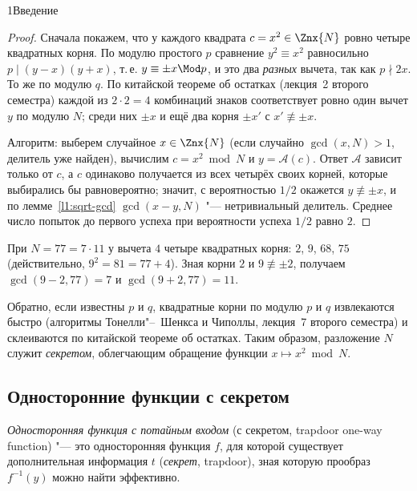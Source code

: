 \begin{lecture}{1}{Введение}
\begin{proof}
Сначала покажем, что у каждого квадрата $c = x^2 \in \Znx{N}$ ровно четыре квадратных корня.
По модулю простого $p$ сравнение $y^2 \equiv x^2$ равносильно $p \mid (y - x)(y + x)$, т.\,е.
$y \equiv \pm x \Mod p$, и это два \emph{разных} вычета, так как $p \nmid 2x$. То же по модулю
$q$. По китайской теореме об остатках (лекция~2 второго семестра) каждой из $2 \cdot 2 = 4$
комбинаций знаков соответствует ровно один вычет $y$ по модулю $N$; среди них $\pm x$ и ещё
два корня $\pm x'$ с $x' \not\equiv \pm x$.

Алгоритм: выберем случайное $x \in \Znx{N}$ (если случайно $\gcd(x, N) > 1$, делитель уже
найден), вычислим $c = x^2 \bmod N$ и $y = \mathcal A(c)$. Ответ $\mathcal A$ зависит только
от $c$, а $c$ одинаково получается из всех четырёх своих корней, которые выбирались бы
равновероятно; значит, с вероятностью $1/2$ окажется $y \not\equiv \pm x$, и по
лемме~\ref{l1:sqrt-gcd} $\gcd(x - y, N)$ "--- нетривиальный делитель. Среднее число попыток до
первого успеха при вероятности успеха $1/2$ равно $2$.
\end{proof}

\begin{example}
При $N = 77 = 7 \cdot 11$ у вычета $4$ четыре квадратных корня: $2$, $9$, $68$, $75$
(действительно, $9^2 = 81 = 77 + 4$). Зная корни $2$ и $9 \not\equiv \pm 2$, получаем
$\gcd(9 - 2, 77) = 7$ и $\gcd(9 + 2, 77) = 11$.
\end{example}

Обратно, если известны $p$ и $q$, квадратные корни по модулю $p$ и $q$ извлекаются быстро
(алгоритмы Тонелли"--~Шенкса и Чиполлы, лекция~7 второго семестра) и склеиваются по китайской
теореме об остатках. Таким образом, разложение $N$ служит \emph{секретом}, облегчающим
обращение функции $x \mapsto x^2 \bmod N$.

\subsection{Односторонние функции с секретом}

\begin{definition}[неформальное]\label{l1:tdf}
\emph{Односторонняя функция с потайным входом} (с секретом, trapdoor one-way function) "---
это односторонняя функция $f$, для которой существует дополнительная информация $t$
(\emph{секрет}, trapdoor), зная которую прообраз $f^{-1}(y)$ можно найти эффективно.
\end{definition}


\end{lecture}
